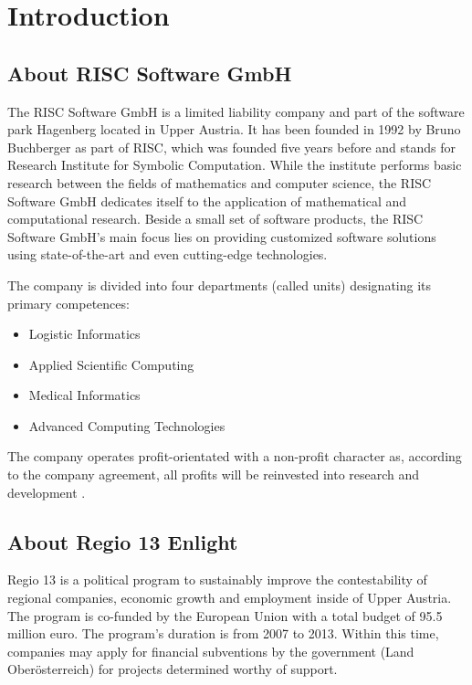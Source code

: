 \section{Introduction}

\subsection{About RISC Software GmbH}

The RISC Software GmbH is a limited liability company and part of the software park Hagenberg located in Upper Austria. It has been founded in 1992 by Bruno Buchberger as part of RISC, which was founded five years before and stands for Research Institute for Symbolic Computation. While the institute performs basic research between the fields of mathematics and computer science, the RISC Software GmbH dedicates itself to the application of mathematical and computational research. Beside a small set of software products, the RISC Software GmbH's main focus lies on providing customized software solutions using state-of-the-art and even cutting-edge technologies.

The company is divided into four departments (called units) designating its primary competences:

\begin{itemize}
	\item Logistic Informatics
	\item Applied Scientific Computing
	\item Medical Informatics
	\item Advanced Computing Technologies
\end{itemize}

The company operates profit-orientated with a non-profit character as, according to the company agreement, all profits will be reinvested into research and development \cite{risc_website}.


\subsection{About Regio 13 Enlight}

Regio 13 is a political program to sustainably improve the contestability of regional companies, economic growth and employment inside of Upper Austria. The program is co-funded by the European Union with a total budget of 95.5 million euro. The program's duration is from 2007 to 2013. Within this time, companies may apply for financial subventions by the government (Land Oberösterreich) for projects determined worthy of support.

